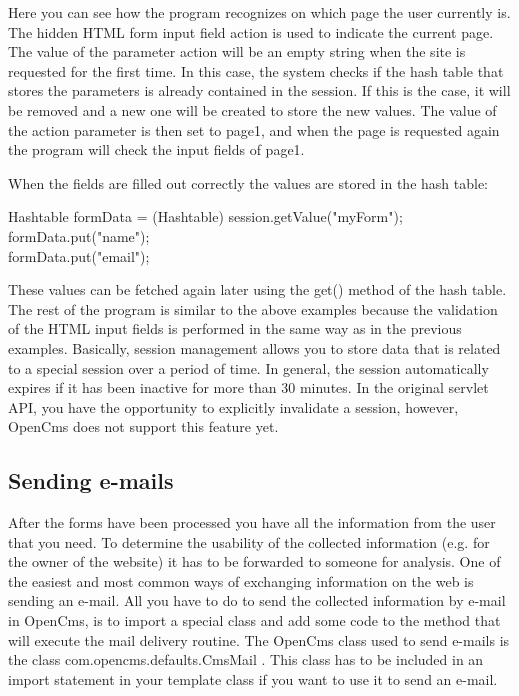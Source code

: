 Here you can see how the program recognizes on which page the user
currently is. The hidden HTML form input field {\name action} is used to
indicate the current page. The value of the parameter {\name action} will be an empty
string when the site is requested for the first time. In this case, the
system checks if the hash table that stores the parameters is already
contained in the session. If this is the case, it will be removed and a
new one will be created to store the new values. The value of the {\name action} parameter 
is then set to {\name page1}, and when the page is requested again
the program will check the input fields of page1.

When the fields are filled out correctly the values are stored in the
hash table:
\begin{java}
Hashtable formData = (Hashtable) session.getValue("myForm");\\
formData.put("name");\\
formData.put("email");\\
\end{java}


These values can be fetched again later using the {\meth  get()} method of the
hash table. The rest of the program is similar to the above examples
because the validation of the HTML input fields is performed in the same
way as in the previous examples.
Basically, session management allows you to store data that is related
to a special session over a period of time. In general, the session
automatically expires if it has been inactive for more than 30 minutes.
In the original servlet API, you have the opportunity to explicitly
invalidate a session, however, OpenCms does not support this feature yet.


\subsection{Sending e-mails}

After the forms have been processed you have all the information from
the user that you need. To determine the usability of the collected
information (e.g. for the owner of the website) it has to be forwarded to
someone for analysis. One of the easiest and most common ways of exchanging
information on the web is sending an e-mail. All you have to do to
send the collected information by e-mail in OpenCms, is to import a special class
and add some code to the method that will execute the mail delivery
routine. 
The OpenCms class used to send e-mails is the class {\class com.opencms.defaults.CmsMail} .
This class has to be included in an import statement in your template class
if you want to use it to send an e-mail.

